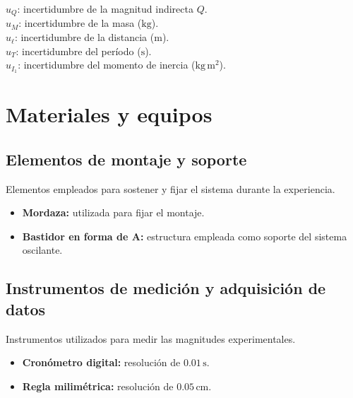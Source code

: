 \documentclass[11pt,a4paper]{article}
\newenvironment{subsectionbody}
{%
    \begin{list}{}{%
        \setlength{\leftmargin}{0.6cm}%
        \setlength{\rightmargin}{0cm}%
        \setlength{\topsep}{0pt}%
        \setlength{\partopsep}{0pt}%
        \setlength{\parsep}{0pt}%
        \setlength{\itemsep}{0pt}%
    }%
    \item\relax
}
{%
    \end{list}
}
\begin{document}
\begin{subsectionbody}
\hspace*{0.5cm}$u_Q$: incertidumbre de la magnitud indirecta $Q$.\\
\hspace*{0.5cm}$u_M$: incertidumbre de la masa ($\mathrm{kg}$).\\
\hspace*{0.5cm}$u_\ell$: incertidumbre de la distancia ($\mathrm{m}$).\\
\hspace*{0.5cm}$u_T$: incertidumbre del período ($\mathrm{s}$).\\
\hspace*{0.5cm}$u_{I_1}$: incertidumbre del momento de inercia
($\mathrm{kg\,m^2}$).

\end{subsectionbody}

\newpage
\section{Materiales y equipos}

\subsection{Elementos de montaje y soporte}

Elementos empleados para sostener y fijar el sistema durante la experiencia.

\begin{itemize}
    \item \textbf{Mordaza:} utilizada para fijar el montaje.
    \item \textbf{Bastidor en forma de A:} estructura empleada como soporte del sistema oscilante.
\end{itemize}

\subsection{Instrumentos de medición y adquisición de datos}

Instrumentos utilizados para medir las magnitudes experimentales.

\begin{itemize}
    \item \textbf{Cronómetro digital:} resolución de $0.01\,\mathrm{s}$.
    \item \textbf{Regla milimétrica:} resolución de $0.05\,\mathrm{cm}$.
\end{itemize}
\end{document}
